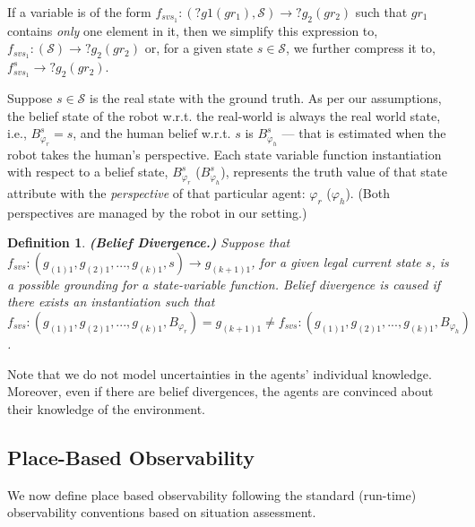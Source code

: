 \documentclass[letterpaper]{article} %
\newtheorem{definition}{Definition}
\begin{document}
If a variable is of the form $f_{svs_1}: (?g1 (gr_1), \mathcal{S}) \rightarrow ?g_2 (gr_2)$ such that $gr_1$ contains \textit{only} one element in it, then we simplify this expression to, $f_{svs_1}: (\mathcal{S}) \rightarrow ?g_2 (gr_2)$ or, for a given state $s \in \mathcal{S}$, we further compress it to, $f_{svs_1}^{s} \rightarrow ?g_2 (gr_2)$. 

Suppose $s \in \mathcal{S}$ is the real state with the ground truth. As per our assumptions, the belief state of the robot w.r.t. the real-world is always the real world state, i.e., $B_{\varphi_r}^s = s$, and the human belief w.r.t. $s$ is $B_{\varphi_h}^s$ --- that is estimated when the robot takes the human's perspective. Each state variable function instantiation with respect to a belief state, $B_{\varphi_r}^s$ ($B_{\varphi_h}^s$), represents the truth value of that state attribute with the \textit{perspective} of that particular agent: $\varphi_r$ ($\varphi_h$). (Both perspectives are managed by the robot in our setting.) 

\begin{definition}
\textbf{(Belief Divergence.)}
Suppose that $f_{\textit{svs}}:(g_{(1)1},g_{(2)1},...,g_{(k)1},s)\rightarrow g_{(k+1)1}$, for a given legal current state $s$, is a possible {\em grounding} for a state-variable function. 
Belief divergence is caused if there exists an instantiation such that $f_{\textit{svs}}:(g_{(1)1},g_{(2)1},...,g_{(k)1},B_{\varphi_r}) = {g_{(k+1)1}}  \neq f_{\textit{svs}}:(g_{(1)1},g_{(2)1},...,g_{(k)1},B_{\varphi_h})$.
\end{definition} 
Note that we do not model uncertainties in the agents' individual knowledge. Moreover, even if there are belief divergences, the agents are convinced about their knowledge of the environment.

\subsection{Place-Based Observability}
We now define place based observability following the standard (run-time) observability conventions based on situation assessment.
\end{document}
